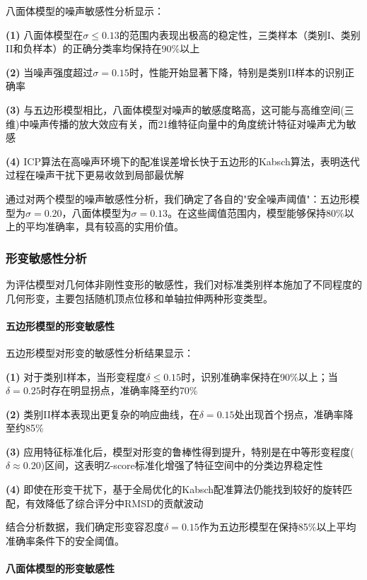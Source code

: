 八面体模型的噪声敏感性分析显示：

\textbf{(1)} 八面体模型在$\sigma \leq 0.13$的范围内表现出极高的稳定性，三类样本（类别I、类别II和负样本）的正确分类率均保持在90\%以上

\textbf{(2)} 当噪声强度超过$\sigma = 0.15$时，性能开始显著下降，特别是类别II样本的识别正确率

\textbf{(3)} 与五边形模型相比，八面体模型对噪声的敏感度略高，这可能与高维空间(三维)中噪声传播的放大效应有关，而21维特征向量中的角度统计特征对噪声尤为敏感

\textbf{(4)} ICP算法在高噪声环境下的配准误差增长快于五边形的Kabsch算法，表明迭代过程在噪声干扰下更易收敛到局部最优解

通过对两个模型的噪声敏感性分析，我们确定了各自的"安全噪声阈值"：五边形模型为$\sigma = 0.20$，八面体模型为$\sigma = 0.13$。在这些阈值范围内，模型能够保持80\%以上的平均准确率，具有较高的实用价值。

\subsubsection{形变敏感性分析}

为评估模型对几何体非刚性变形的敏感性，我们对标准类别样本施加了不同程度的几何形变，主要包括随机顶点位移和单轴拉伸两种形变类型。

\paragraph{五边形模型的形变敏感性}

五边形模型对形变的敏感性分析结果显示：

\textbf{(1)} 对于类别I样本，当形变程度$\delta \leq 0.15$时，识别准确率保持在90\%以上；当$\delta = 0.25$时存在明显拐点，准确率降至约70\%

\textbf{(2)} 类别II样本表现出更复杂的响应曲线，在$\delta = 0.15$处出现首个拐点，准确率降至约85\%

\textbf{(3)} 应用特征标准化后，模型对形变的鲁棒性得到提升，特别是在中等形变程度($\delta \approx 0.20$)区间，这表明Z-score标准化增强了特征空间中的分类边界稳定性

\textbf{(4)} 即使在形变干扰下，基于全局优化的Kabsch配准算法仍能找到较好的旋转匹配，有效降低了综合评分中RMSD的贡献波动

结合分析数据，我们确定形变容忍度$\delta = 0.15$作为五边形模型在保持85\%以上平均准确率条件下的安全阈值。

\paragraph{八面体模型的形变敏感性}

